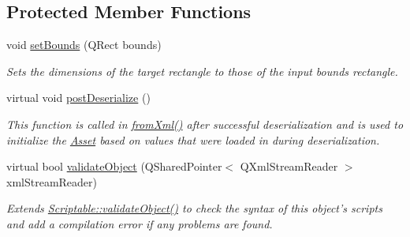 \subsection*{Protected Member Functions}
\begin{DoxyCompactItemize}
\item 
\hypertarget{class_picto_1_1_rect_target_adb8a78878e6c7d4c247ce911c3f34917}{void \hyperlink{class_picto_1_1_rect_target_adb8a78878e6c7d4c247ce911c3f34917}{set\-Bounds} (Q\-Rect bounds)}\label{class_picto_1_1_rect_target_adb8a78878e6c7d4c247ce911c3f34917}

\begin{DoxyCompactList}\small\item\em Sets the dimensions of the target rectangle to those of the input bounds rectangle. \end{DoxyCompactList}\item 
virtual void \hyperlink{class_picto_1_1_rect_target_a3e49cfeaf2c0247b1881cd377f8a4a2e}{post\-Deserialize} ()
\begin{DoxyCompactList}\small\item\em This function is called in \hyperlink{class_picto_1_1_asset_a8bed4da09ecb1c07ce0dab313a9aba67}{from\-Xml()} after successful deserialization and is used to initialize the \hyperlink{class_picto_1_1_asset}{Asset} based on values that were loaded in during deserialization. \end{DoxyCompactList}\item 
\hypertarget{class_picto_1_1_rect_target_a5adb0786838bf59e20c6ace988c50857}{virtual bool \hyperlink{class_picto_1_1_rect_target_a5adb0786838bf59e20c6ace988c50857}{validate\-Object} (Q\-Shared\-Pointer$<$ Q\-Xml\-Stream\-Reader $>$ xml\-Stream\-Reader)}\label{class_picto_1_1_rect_target_a5adb0786838bf59e20c6ace988c50857}

\begin{DoxyCompactList}\small\item\em Extends \hyperlink{class_picto_1_1_scriptable_ab6e2944c43a3b5d418bf7b251594386d}{Scriptable\-::validate\-Object()} to check the syntax of this object's scripts and add a compilation error if any problems are found. \end{DoxyCompactList}\end{DoxyCompactItemize}
